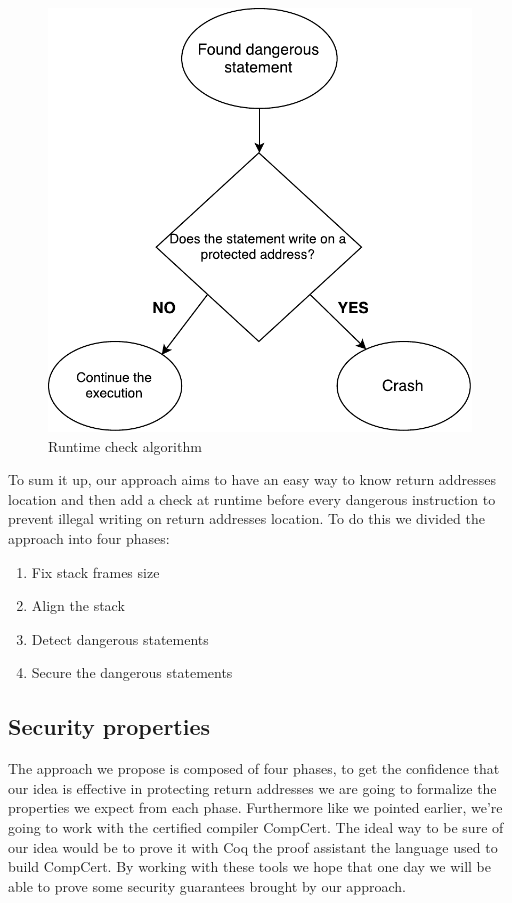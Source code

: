 \documentclass[11pt]{sdm}
\begin{document}
\begin{figure}
\centering
\includegraphics[scale=0.6]{images/runtime_check.pdf}
\caption{Runtime check algorithm}
\label{runtime_check}
\end{figure}

	To sum it up, our approach aims to have an easy way to know return addresses location and then add a check at runtime before every dangerous instruction to prevent illegal writing on return addresses location.
To do this we divided the approach into four phases:
\begin{enumerate}
	\item Fix stack frames size
	\item Align the stack
	\item Detect dangerous statements
	\item Secure the dangerous statements
\end{enumerate}


\subsection{Security properties}
\label{sub:Security properties}
	The approach we propose is composed of four phases, to get the confidence that our idea is effective in protecting return addresses we are going to formalize the properties we expect from each phase. 
Furthermore like we pointed earlier, we're going to work with the certified compiler CompCert.
The ideal way to be sure of our idea would be to prove it with Coq the proof assistant the language used to build CompCert.
By working with these tools we hope that one day we will be able to prove some security guarantees brought by our approach.
\end{document}
